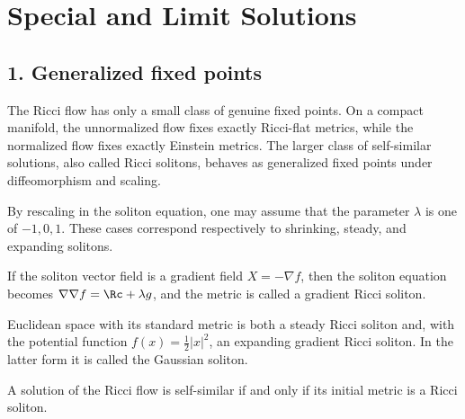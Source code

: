 \chapter{Special and Limit Solutions}

\section*{1. Generalized fixed points}

The Ricci flow has only a small class of genuine fixed points. On a compact
manifold, the unnormalized flow fixes exactly Ricci-flat metrics, while the
normalized flow fixes exactly Einstein metrics. The larger class of
self-similar solutions, also called Ricci solitons, behaves as generalized
fixed points under diffeomorphism and scaling.

\begin{remark}
\label{ch02-rem-self-similar-solutions}
By rescaling in the soliton equation, one may assume that the parameter
\(\lambda\) is one of \(-1,0,1\). These cases correspond respectively to
shrinking, steady, and expanding solitons.
\end{remark}

\begin{remark}
\label{ch02-rem-gradient-solitons}
If the soliton vector field is a gradient field \(X=-\nabla f\), then the
soliton equation becomes \(\nabla\nabla f=\Rc+\lambda g\), and the metric is
called a gradient Ricci soliton.
\end{remark}

\begin{example}
\label{ch02-ex-gaussian-soliton}
Euclidean space with its standard metric is both a steady Ricci soliton and,
with the potential function \(f(x)=\frac12|x|^2\), an expanding gradient Ricci
soliton. In the latter form it is called the Gaussian soliton.
\end{example}

\begin{lemma}
\label{ch02-lem-self-similar-solutions-and-solitons}
A solution of the Ricci flow is self-similar if and only if its initial metric
is a Ricci soliton.
\end{lemma}

